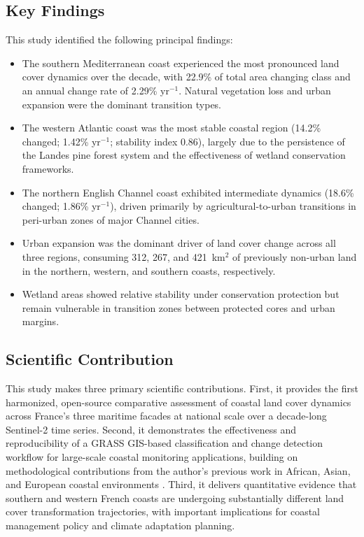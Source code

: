 \documentclass[remotesensing,article,submit,pdftex,moreauthors]{Definitions/mdpi}
\begin{document}
\subsection{Key Findings}

This study identified the following principal findings:

\begin{itemize}
\item The southern Mediterranean coast experienced the most pronounced land cover dynamics over the decade, with 22.9\% of total area changing class and an annual change rate of 2.29\% yr$^{-1}$. Natural vegetation loss and urban expansion were the dominant transition types.

\item The western Atlantic coast was the most stable coastal region (14.2\% changed; 1.42\% yr$^{-1}$; stability index 0.86), largely due to the persistence of the Landes pine forest system and the effectiveness of wetland conservation frameworks.

\item The northern English Channel coast exhibited intermediate dynamics (18.6\% changed; 1.86\% yr$^{-1}$), driven primarily by agricultural-to-urban transitions in peri-urban zones of major Channel cities.

\item Urban expansion was the dominant driver of land cover change across all three regions, consuming 312, 267, and 421~km$^2$ of previously non-urban land in the northern, western, and southern coasts, respectively.

\item Wetland areas showed relative stability under conservation protection but remain vulnerable in transition zones between protected cores and urban margins.
\end{itemize}

\subsection{Scientific Contribution}

This study makes three primary scientific contributions. First, it provides the first harmonized, open-source comparative assessment of coastal land cover dynamics across France's three maritime facades at national scale over a decade-long Sentinel-2 time series. Second, it demonstrates the effectiveness and reproducibility of a GRASS GIS-based classification and change detection workflow for large-scale coastal monitoring applications, building on methodological contributions from the author's previous work in African, Asian, and European coastal environments \citep{jmse12081279, earth5030024, jimaging11080249}. Third, it delivers quantitative evidence that southern and western French coasts are undergoing substantially different land cover transformation trajectories, with important implications for coastal management policy and climate adaptation planning.
\end{document}
